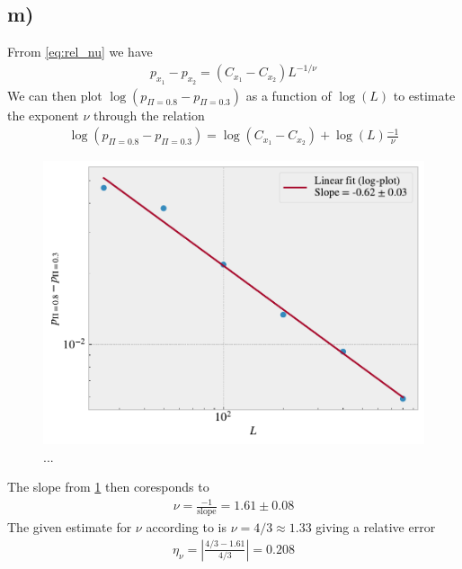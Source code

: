 \documentclass[reprint, amsmath, amssymb, aps]{revtex4-2}
\begin{document}
\subsection*{m)}
Frrom \ref{eq:rel_nu} we have
\begin{align*}
  p_{x_1} - p_{x_2} = (C_{x_1} - C_{x_2})L^{-1/\nu}
\end{align*}
We can then plot $\log{(p_{\Pi = 0.8} - p_{\Pi = 0.3})}$ as a function of $\log{(L)}$ to estimate the exponent $\nu$ through the relation
\begin{align*}
  \log{(p_{\Pi = 0.8} - p_{\Pi = 0.3})} =  \log{(C_{x_1} - C_{x_2})} + \log{(L)} \frac{-1}{\nu}
\end{align*}
\begin{figure}[H]
  \includegraphics[width=\linewidth]{figures/m.pdf}
  \caption{...}
  \label{fig:m}
\end{figure}
The slope from \ref{fig:m} then coresponds to
\begin{align*}
  \nu = \frac{-1}{\text{slope}} = 1.61 \pm 0.08
\end{align*}
The given estimate for $\nu$ according to \cite{textbook} is $\nu = 4/3 \approx 1.33$ giving a relative error
\begin{align*}
  \eta_\nu= \left|\frac{4/3 - 1.61}{4/3}\right| = 0.208
\end{align*}
%
%
\end{document}
